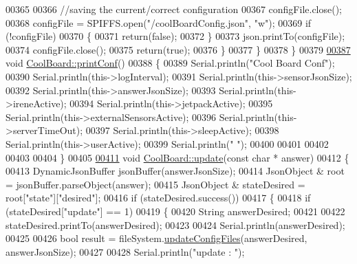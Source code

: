 \begin{DoxyCode}
00365 
00366             \textcolor{comment}{//saving the current/correct configuration}
00367             configFile.close();
00368             configFile = SPIFFS.open(\textcolor{stringliteral}{"/coolBoardConfig.json"}, \textcolor{stringliteral}{"w"});
00369             \textcolor{keywordflow}{if} (!configFile)
00370             \{
00371                 \textcolor{keywordflow}{return}(\textcolor{keyword}{false});
00372             \}
00373             json.printTo(configFile);
00374             configFile.close();
00375             \textcolor{keywordflow}{return}(\textcolor{keyword}{true});
00376         \}
00377     \}
00378 \}
00379 
\hyperlink{class_cool_board_a486507b8f0981d3cc671ed31c2145755}{00387} \textcolor{keywordtype}{void} \hyperlink{class_cool_board_a486507b8f0981d3cc671ed31c2145755}{CoolBoard::printConf}()
00388 \{
00389     Serial.println(\textcolor{stringliteral}{"Cool Board Conf"});
00390     Serial.println(this->logInterval);
00391     Serial.println(this->sensorJsonSize);
00392     Serial.println(this->answerJsonSize);
00393     Serial.println(this->ireneActive);
00394     Serial.println(this->jetpackActive);
00395     Serial.println(this->externalSensorsActive);
00396     Serial.println(this->serverTimeOut);
00397     Serial.println(this->sleepActive);
00398     Serial.println(this->userActive);
00399     Serial.println(\textcolor{stringliteral}{" "});
00400 
00401 
00402 
00403 
00404 \}
00405 
\hyperlink{class_cool_board_a8612756d3f73198cdde857a66f0fe690}{00411} \textcolor{keywordtype}{void} \hyperlink{class_cool_board_a8612756d3f73198cdde857a66f0fe690}{CoolBoard::update}(\textcolor{keyword}{const} \textcolor{keywordtype}{char} * answer)
00412 \{
00413     DynamicJsonBuffer jsonBuffer(answerJsonSize);
00414     JsonObject & root = jsonBuffer.parseObject(answer);
00415     JsonObject & stateDesired = root[\textcolor{stringliteral}{"state"}][\textcolor{stringliteral}{"desired"}];
00416     \textcolor{keywordflow}{if} (stateDesired.success())
00417     \{
00418         \textcolor{keywordflow}{if} (stateDesired[\textcolor{stringliteral}{"update"}] == 1)
00419         \{
00420             String answerDesired;
00421 
00422             stateDesired.printTo(answerDesired);
00423 
00424             Serial.println(answerDesired);
00425             
00426             \textcolor{keywordtype}{bool} result = fileSystem.\hyperlink{class_cool_file_system_a32dad79ae80182a83e2e8f52286b7c7b}{updateConfigFiles}(answerDesired, answerJsonSize);
00427 
00428             Serial.println(\textcolor{stringliteral}{"update : "});

\end{DoxyCode}

